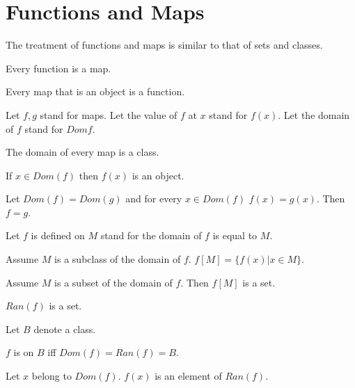 \documentclass[11pt]{article}
\begin{document}
\section{Functions and Maps}
The treatment of functions and maps is similar to that
of sets and classes.
\begin{forthel}

\begin{lemma} Every function is a map.
\end{lemma}

\begin{lemma} Every map that is an object is a function.
\end{lemma}

Let $f,g$ stand for maps.
Let the value of $f$ at $x$ stand for $f(x)$.
Let the domain of $f$ stand for $Dom f$.

\begin{lemma} The domain of every map is a class.
\end{lemma}

\begin{lemma} If $x \in Dom(f)$ then $f(x)$ is an object.
\end{lemma}

\begin{lemma}  Let $Dom(f)=Dom(g)$ and for every $x \in Dom(f)$
$f(x)=g(x)$. Then $f=g$.
\end{lemma}

Let $f$ is defined on $M$ stand for the domain of $f$ is 
equal to $M$.


\begin{definition}
Assume $M$ is a subclass of the domain of $f$. 
$f[M] = \{ f(x) | x \in M \}$.
\end{definition}

\begin{axiom} 
Assume $M$ is a subset of the domain of $f$. 
Then $f[M]$ is a set.
\end{axiom}

\begin{signature} [RanSort]  $Ran(f)$ is a set.
\end{signature}

Let $B$ denote a class.

\begin{definition} [DefDom]  $f$ is on $B$ iff 
$Dom(f) = Ran(f) = B$.
\end{definition}

\begin{axiom} [ImgSort]  Let $x$ belong to $Dom(f)$.
    $f(x)$ is an element of $Ran(f)$.
\end{axiom}

\end{forthel}
\end{document}
